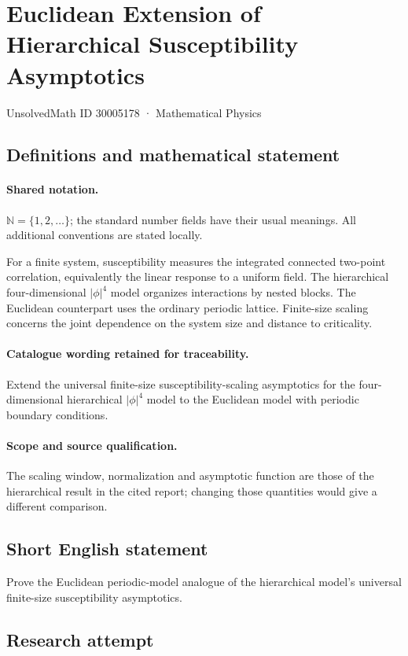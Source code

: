 \documentclass[11pt]{article}
\begin{document}
\setcounter{section}{30005177}
\section{Euclidean Extension of Hierarchical Susceptibility Asymptotics}\label{30005178}
{\small UnsolvedMath ID 30005178 · Mathematical Physics}
\subsection{Definitions and mathematical statement}

\paragraph{Shared notation.}$\mathbb N=\{1,2,\ldots\}$; the standard number fields have their usual meanings. All additional conventions are stated locally.


For a finite system, susceptibility measures the integrated connected two-point correlation, equivalently the linear response to a uniform field. The hierarchical four-dimensional $|\phi|^4$ model organizes interactions by nested blocks. The Euclidean counterpart uses the ordinary periodic lattice. Finite-size scaling concerns the joint dependence on the system size and distance to criticality.

\paragraph{Catalogue wording retained for traceability.}
Extend the universal finite-size susceptibility-scaling asymptotics for the four-dimensional hierarchical $|\phi|^4$ model to the Euclidean model with periodic boundary conditions.

\paragraph{Scope and source qualification.}The scaling window, normalization and asymptotic function are those of the hierarchical result in the cited report; changing those quantities would give a different comparison.
\subsection{Short English statement}
Prove the Euclidean periodic-model analogue of the hierarchical model's universal finite-size susceptibility asymptotics.
\subsection{Research attempt}
\end{document}
